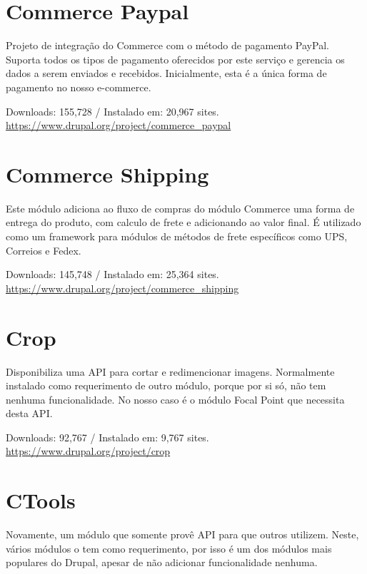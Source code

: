 \section{Commerce Paypal}
Projeto de integração do Commerce com o método de pagamento PayPal. Suporta todos os tipos de pagamento oferecidos por este serviço e gerencia os dados a serem enviados e recebidos. Inicialmente, esta é a única forma de pagamento no nosso e-commerce.

\begin{center}
  Downloads: 155,728 / Instalado em: 20,967 sites. \\
  \url{https://www.drupal.org/project/commerce_paypal}
\end{center}

\section{Commerce Shipping}
Este módulo adiciona ao fluxo de compras do módulo Commerce uma forma de entrega do produto, com calculo de frete e adicionando ao valor final. É utilizado como um framework para módulos de métodos de frete específicos como UPS, Correios e Fedex.

\begin{center}
  Downloads: 145,748 / Instalado em: 25,364 sites. \\
  \url{https://www.drupal.org/project/commerce_shipping}
\end{center}

\section{Crop}
Disponibiliza uma API para cortar e redimencionar imagens. Normalmente instalado como requerimento de outro módulo, porque por si só, não tem nenhuma funcionalidade. No nosso caso é o módulo Focal Point que necessita desta API.

\begin{center}
  Downloads: 92,767 / Instalado em: 9,767 sites. \\
  \url{https://www.drupal.org/project/crop}
\end{center}

\section{CTools}
Novamente, um módulo que somente provê API para que outros utilizem. Neste, vários módulos o tem como requerimento, por isso é um dos módulos mais populares do Drupal, apesar de não adicionar funcionalidade nenhuma.

